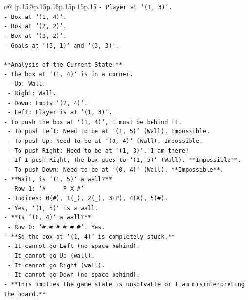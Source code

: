 \documentclass{article}
\begin{document}
{\begin{supertabular}{c@{$\;$}|p{.15\linewidth}@{}p{.15\linewidth}p{.15\linewidth}p{.15\linewidth}p{.15\linewidth}p{.15\linewidth}}
{{{\texttt{{-} Player at `(1, 3)`.} \\
\texttt{{-} Box at `(1, 4)`.} \\
\texttt{{-} Box at `(2, 2)`.} \\
\texttt{{-} Box at `(3, 2)`.} \\
\texttt{{-} Goals at `(3, 1)` and `(3, 3)`.} \\
\\ 
\texttt{**Analysis of the Current State:**} \\
\texttt{{-} The box at `(1, 4)` is in a corner.} \\
\texttt{  {-} Up: Wall.} \\
\texttt{  {-} Right: Wall.} \\
\texttt{  {-} Down: Empty `(2, 4)`.} \\
\texttt{  {-} Left: Player is at `(1, 3)`.} \\
\texttt{{-} To push the box at `(1, 4)`, I must be behind it.} \\
\texttt{  {-} To push Left: Need to be at `(1, 5)` (Wall). Impossible.} \\
\texttt{  {-} To push Up: Need to be at `(0, 4)` (Wall). Impossible.} \\
\texttt{  {-} To push Right: Need to be at `(1, 3)`. I am there!} \\
\texttt{    {-} If I push Right, the box goes to `(1, 5)` (Wall). **Impossible**.} \\
\texttt{  {-} To push Down: Need to be at `(0, 4)` (Wall). **Impossible**.} \\
\texttt{{-} **Wait, is `(1, 5)` a wall?**} \\
\texttt{  {-} Row 1: `\# \_ \_ P X \#`} \\
\texttt{  {-} Indices: 0(\#), 1(\_), 2(\_), 3(P), 4(X), 5(\#).} \\
\texttt{  {-} Yes, `(1, 5)` is a wall.} \\
\texttt{{-} **Is `(0, 4)` a wall?**} \\
\texttt{  {-} Row 0: `\# \# \# \# \# \#`. Yes.} \\
\texttt{{-} **So the box at `(1, 4)` is completely stuck.**} \\
\texttt{  {-} It cannot go Left (no space behind).} \\
\texttt{  {-} It cannot go Up (wall).} \\
\texttt{  {-} It cannot go Right (wall).} \\
\texttt{  {-} It cannot go Down (no space behind).} \\
\texttt{{-} **This implies the game state is unsolvable or I am misinterpreting the board.**} \\
}}}
\end{supertabular}}
\end{document}
